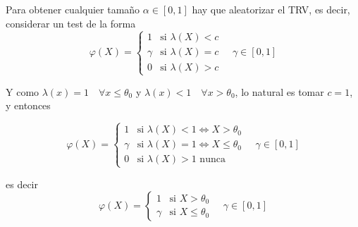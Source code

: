 \documentclass[12pt]{article}
\begin{document}
\begin{ejercicio}[2,4 puntos]
\begin{enumerate}
            Para obtener cualquier tamaño $\alpha \in [0,1]$ hay que aleatorizar el TRV, es decir, considerar un test
            de la forma
            $$\varphi(X) = \begin{cases}
                1 &\text{si } \lambda(X) < c \\
                \gamma &\text{si } \lambda(X) = c \\ 
                0 &\text{si } \lambda(X) > c
            \end{cases} \quad \gamma \in [0,1]$$

            Y como $\lambda(x) = 1 \quad \forall x \leq \theta_0$ y $\lambda(x) < 1 \quad \forall x > \theta_0$, 
            lo natural es tomar $c=1$, y entonces

            $$\varphi(X) = \begin{cases}
                1 &\text{si } \lambda(X) < 1 \iff X > \theta_0 \\
                \gamma &\text{si } \lambda(X) = 1 \iff X \leq \theta_0 \\ 
                0 &\text{si } \lambda(X) > 1 \text{ nunca}
            \end{cases} \quad \gamma \in [0,1]$$

            es decir
            $$\varphi(X) = \begin{cases}
                1 &\text{si } X > \theta_0 \\
                \gamma &\text{si } X \leqslant \theta_0
            \end{cases} \quad \gamma \in [0,1]$$


\end{enumerate}
\end{ejercicio}
\end{document}
